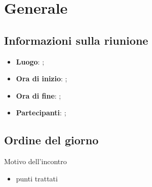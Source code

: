 \section{Generale}

\vspace{10pt}


\subsection{Informazioni sulla riunione}
\begin{itemize}
	\item \textbf{Luogo}: ;
	\item \textbf{Ora di inizio}: ;
	\item \textbf{Ora di fine}: ;
	\item \textbf{Partecipanti}: ;
\end{itemize}

\vspace{5pt}

\subsection{Ordine del giorno}
Motivo dell'incontro
\begin{itemize}
	\item punti trattati
\end{itemize}
